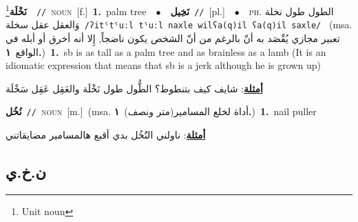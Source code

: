 \documentclass[10pt,a4paper,twoside]{article} %
\begin{document}
\begin{multicols}{2}
{\setlength\topsep{0pt}\textbf{\foreignlanguage{arabic}{نَخْلَة}}\footnote{Unit noun}\ \ {\color{gray}\texttt{//}\color{black}}\ \textsc{noun}\ [f.]\ \textbf{1.}~palm tree\ \ $\bullet$\ \ \setlength\topsep{0pt}\textbf{\foreignlanguage{arabic}{نَخِيل}}\ {\color{gray}\texttt{//}\color{black}}\ [pl.]\ \ $\bullet$\ \ \textsc{ph.} \color{gray} \foreignlanguage{arabic}{الطول طول نخلة وَالعقل عقل سخلة}\color{black}\ {\color{gray}\texttt{/{\sffamily ʔitˤtˤuːl tˤuːl naxle wilʕa(q)il ʕa(q)il saxle}/}\color{black}}\ \color{gray} (msa. \foreignlanguage{arabic}{تعبير مجازي يُقْصَد به أنّ بالرغم من أنّ الشخص يكون ناضجاً, إِلا أنه أخرق أو أبله في الواقع}~\foreignlanguage{arabic}{\textbf{١.}})\color{black}\ \textbf{1.}~sb is as tall as a palm tree and as brainless as a lamb (It is an idiomatic expression that means that sb is a jerk although he is grown up)\  \begin{flushright}\color{gray}\foreignlanguage{arabic}{\textbf{\underline{\foreignlanguage{arabic}{أمثلة}}}: شايف كيف بتنطوط؟ الطُّول طول نَخْلَة والعَقِل عَقِل سَخْلَة}\end{flushright}\color{black}} \vspace{2mm}

{\setlength\topsep{0pt}\textbf{\foreignlanguage{arabic}{نُخُل}}\ {\color{gray}\texttt{//}\color{black}}\ \textsc{noun}\ [m.]\ \color{gray}(msa. \foreignlanguage{arabic}{أداة لخلع المسامير(متر ونصف)}~\foreignlanguage{arabic}{\textbf{١.}})\color{black}\ \textbf{1.}~nail puller\  \begin{flushright}\color{gray}\foreignlanguage{arabic}{\textbf{\underline{\foreignlanguage{arabic}{أمثلة}}}: ناولني النَُخُل بدي أقبع هالمسامير مضايقاتني}\end{flushright}\color{black}} \vspace{2mm}

\vspace{-3mm}
\subsection*{\color{blue}\foreignlanguage{arabic}{ن.خ.ي}\color{blue}{}} 


\end{multicols}
\end{document}
